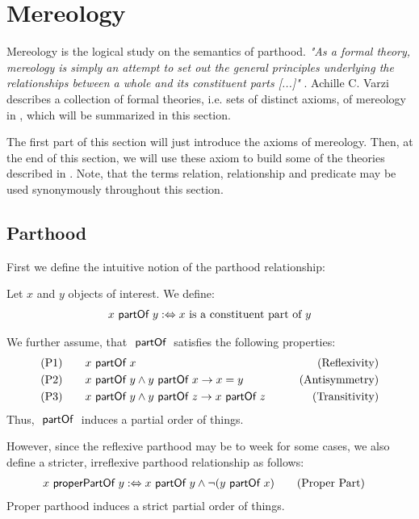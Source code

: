 \section{Mereology}
\label{section:Mereology}
Mereology is the logical study on the semantics of parthood.
\textit{"As a formal theory, mereology is simply
an attempt to set out the general principles underlying the relationships between a whole and its constituent parts [...]"} \cite{DBLP:journals/dke/Varzi96}.
Achille C. Varzi describes a collection of formal theories, i.e. sets of distinct axioms, of mereology in \cite{DBLP:journals/dke/Varzi96}, which will be summarized in this section.


The first part of this section will just introduce the axioms of mereology.
Then, at the end of this section, we will use these axiom to build some of the theories described in \cite{DBLP:journals/dke/Varzi96}.
Note, that the terms relation, relationship and predicate may be used synonymously throughout this section.

\subsection{Parthood}
\label{subsection:Parthood}
First we define the intuitive notion of the parthood relationship:
\begin{definition}[$\partOf$]
Let $x$ and $y$ objects of interest.
We define:
\begin{align}
x ~\textsf{partOf}~ y
:\Leftrightarrow
x \text{ is a constituent part of } y
\end{align}
\end{definition}
We further assume, that $\partOf$ satisfies the following properties:
\begin{align}
&\text{(P1)}
\qquad x ~\textsf{partOf}~ x 
&\qquad \text{(Reflexivity)}
\\
&\text{(P2)}
\qquad x ~\textsf{partOf}~ y \wedge y ~\textsf{partOf}~ x \rightarrow x = y
&\qquad \text{(Antisymmetry)}
\\
&\text{(P3)}
\qquad x ~\textsf{partOf}~ y \wedge y ~\textsf{partOf}~ z \rightarrow x ~\textsf{partOf}~ z
&\qquad \text{(Transitivity)}
\end{align}
Thus, $\partOf$ induces a partial order of things.

However, since the reflexive parthood may be to week for some cases, we also define a stricter, irreflexive parthood relationship as follows:
\begin{align}
x ~\textsf{properPartOf}~ y
:\Leftrightarrow
x ~\textsf{partOf}~ y \wedge \neg(y ~\textsf{partOf}~ x)
&\qquad \text{(Proper Part)}
\label{definition:ProperPart}
\end{align}
Proper parthood induces a strict partial order of things.

